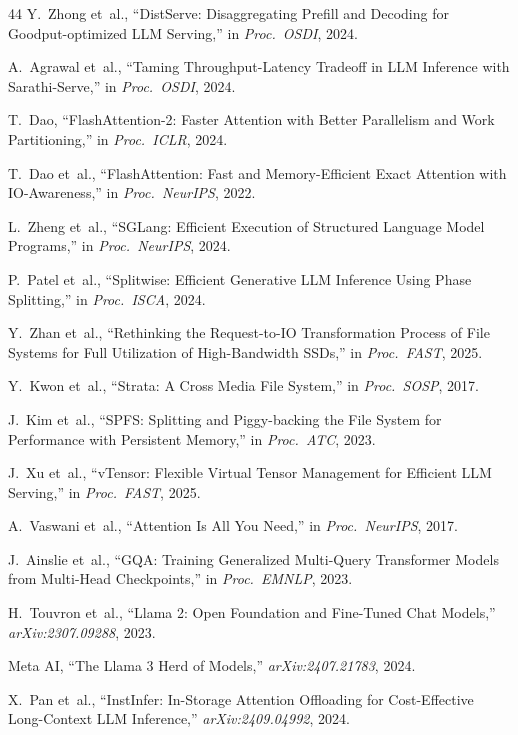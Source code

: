 \documentclass[conference]{IEEEtran}
\begin{document}
\begin{thebibliography}{44}
 Y.~Zhong et~al., ``DistServe: Disaggregating Prefill and Decoding for Goodput-optimized LLM Serving,'' in \textit{Proc.\ OSDI}, 2024.

 A.~Agrawal et~al., ``Taming Throughput-Latency Tradeoff in LLM Inference with Sarathi-Serve,'' in \textit{Proc.\ OSDI}, 2024.

 T.~Dao, ``FlashAttention-2: Faster Attention with Better Parallelism and Work Partitioning,'' in \textit{Proc.\ ICLR}, 2024.

 T.~Dao et~al., ``FlashAttention: Fast and Memory-Efficient Exact Attention with IO-Awareness,'' in \textit{Proc.\ NeurIPS}, 2022.

 L.~Zheng et~al., ``SGLang: Efficient Execution of Structured Language Model Programs,'' in \textit{Proc.\ NeurIPS}, 2024.

 P.~Patel et~al., ``Splitwise: Efficient Generative LLM Inference Using Phase Splitting,'' in \textit{Proc.\ ISCA}, 2024.

 Y.~Zhan et~al., ``Rethinking the Request-to-IO Transformation Process of File Systems for Full Utilization of High-Bandwidth SSDs,'' in \textit{Proc.\ FAST}, 2025.

 Y.~Kwon et~al., ``Strata: A Cross Media File System,'' in \textit{Proc.\ SOSP}, 2017.

 J.~Kim et~al., ``SPFS: Splitting and Piggy-backing the File System for Performance with Persistent Memory,'' in \textit{Proc.\ ATC}, 2023.

 J.~Xu et~al., ``vTensor: Flexible Virtual Tensor Management for Efficient LLM Serving,'' in \textit{Proc.\ FAST}, 2025.

 A.~Vaswani et~al., ``Attention Is All You Need,'' in \textit{Proc.\ NeurIPS}, 2017.

 J.~Ainslie et~al., ``GQA: Training Generalized Multi-Query Transformer Models from Multi-Head Checkpoints,'' in \textit{Proc.\ EMNLP}, 2023.

 H.~Touvron et~al., ``Llama 2: Open Foundation and Fine-Tuned Chat Models,'' \textit{arXiv:2307.09288}, 2023.

 Meta AI, ``The Llama 3 Herd of Models,'' \textit{arXiv:2407.21783}, 2024.

 X.~Pan et~al., ``InstInfer: In-Storage Attention Offloading for Cost-Effective Long-Context LLM Inference,'' \textit{arXiv:2409.04992}, 2024.


\end{thebibliography}
\end{document}
